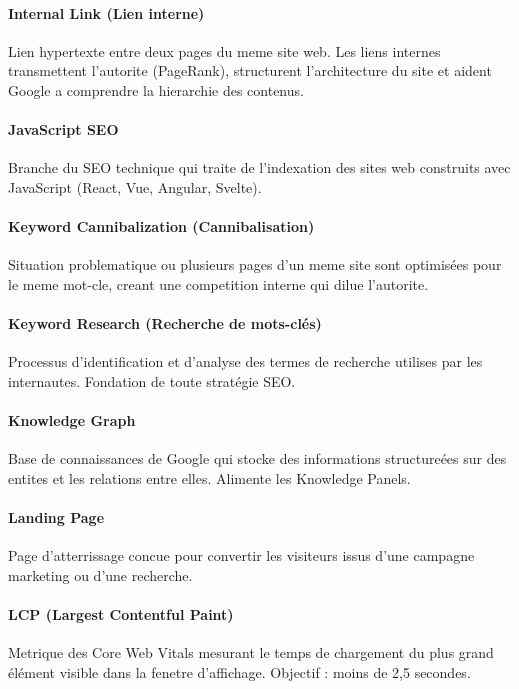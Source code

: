 \documentclass[12pt,a4paper,twoside]{report}
\begin{document}
\paragraph*{Internal Link (Lien interne)}
Lien hypertexte entre deux pages du meme site web. Les liens internes transmettent l'autorite (PageRank), structurent l'architecture du site et aident Google a comprendre la hierarchie des contenus.

\paragraph*{JavaScript SEO}
Branche du SEO technique qui traite de l'indexation des sites web construits avec JavaScript (React, Vue, Angular, Svelte).

\paragraph*{Keyword Cannibalization (Cannibalisation)}
Situation problematique ou plusieurs pages d'un meme site sont optimisées pour le meme mot-cle, creant une competition interne qui dilue l'autorite.

\paragraph*{Keyword Research (Recherche de mots-clés)}
Processus d'identification et d'analyse des termes de recherche utilises par les internautes. Fondation de toute stratégie SEO.

\paragraph*{Knowledge Graph}
Base de connaissances de Google qui stocke des informations structureées sur des entites et les relations entre elles. Alimente les Knowledge Panels.

\paragraph*{Landing Page}
Page d'atterrissage concue pour convertir les visiteurs issus d'une campagne marketing ou d'une recherche.

\paragraph*{LCP (Largest Contentful Paint)}
Metrique des Core Web Vitals mesurant le temps de chargement du plus grand élément visible dans la fenetre d'affichage. Objectif : moins de 2,5 secondes.
\end{document}
